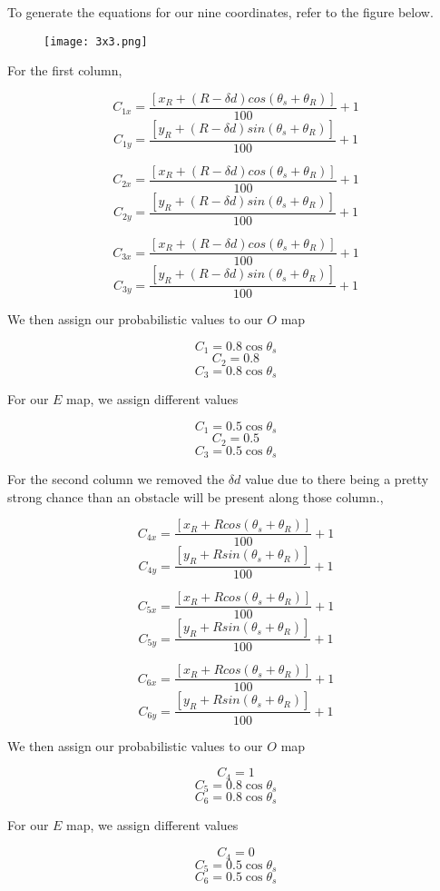 \documentclass[12pt]{article}
\begin{document}
To generate the equations for our nine coordinates, refer to the figure below.

\begin{figure}[htp!]
	\begin{center}
		\texttt{[image: 3x3.png]}
		\caption{} \label{fig.fuz}
	\end{center}
\end{figure}

For the first column,  

\[C_{1x} = \frac{[ x_R + (R - \delta{d}) cos(\theta_s + \theta_R)]}{100} + 1 \]
\[C_{1y} = \frac{[ y_R + (R - \delta{d}) sin(\theta_s + \theta_R)]}{100} + 1 \]

\[C_{2x} = \frac{[ x_R + (R - \delta{d}) cos(\theta_s + \theta_R)]}{100} + 1 \]
\[C_{2y} = \frac{[ y_R + (R - \delta{d}) sin(\theta_s + \theta_R)]}{100} + 1 \]

\[C_{3x} = \frac{[ x_R + (R - \delta{d}) cos(\theta_s + \theta_R)]}{100} + 1 \]
\[C_{3y} = \frac{[ y_R + (R - \delta{d}) sin(\theta_s + \theta_R)]}{100} + 1 \]

We then assign our probabilistic values to our $O$ map

\[ C_1 = 0.8\cos\theta_s \]
\[ C_2 = 0.8 \]
\[ C_3 = 0.8\cos\theta_s \]

For our $E$ map, we assign different values

\[ C_1 = 0.5\cos\theta_s \]
\[ C_2 = 0.5 \]
\[ C_3 = 0.5\cos\theta_s \]


For the second column we removed the $\delta{d}$ value due to there being a pretty strong chance than an obstacle will be present along those column.,  

\[C_{4x} = \frac{[ x_R + Rcos(\theta_s + \theta_R)]}{100} + 1 \]
\[C_{4y} = \frac{[ y_R + R sin(\theta_s + \theta_R)]}{100} + 1 \]

\[C_{5x} = \frac{[ x_R + Rcos(\theta_s + \theta_R)]}{100} + 1 \]
\[C_{5y} = \frac{[ y_R + Rsin(\theta_s + \theta_R)]}{100} + 1 \]

\[C_{6x} = \frac{[ x_R + Rcos(\theta_s + \theta_R)]}{100} + 1 \]
\[C_{6y} = \frac{[ y_R + R sin(\theta_s + \theta_R)]}{100} + 1 \]



We then assign our probabilistic values to our $O$ map

\[ C_4 = 1 \]
\[ C_5 = 0.8\cos\theta_s \]
\[ C_6 = 0.8\cos\theta_s \]

For our $E$ map, we assign different values

\[ C_4 = 0 \]
\[ C_5 = 0.5\cos\theta_s \]
\[ C_6 = 0.5\cos\theta_s \]
\end{document}
